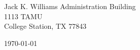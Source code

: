 \begin{minipage}{0.49\textwidth}
\begin{flushleft}
 Jack K. Williams Administration Building\\
1113 TAMU \\
College Station, TX 77843
\end{flushleft}
\end{minipage}
\begin{minipage}{0.47\textwidth}
\begin{flushright}

\today
\end{flushright}
\end{minipage} \\

\newcommand{\univ}{Texas A&M University}
\newcommand{\univshort}{TAMU}
\newcommand{\degree}{Ph.D.}
\newcommand{\dept}{Computer Science}
